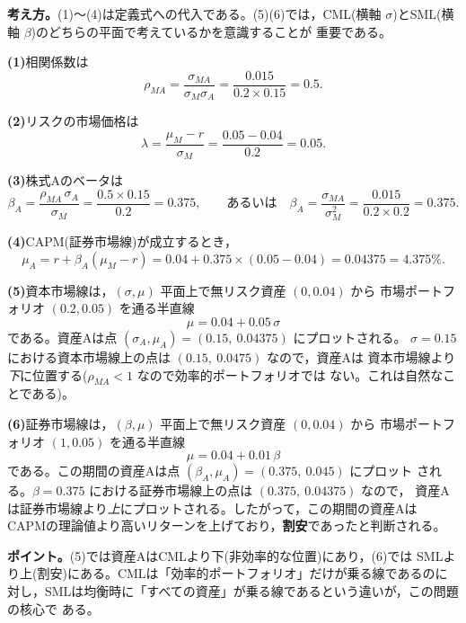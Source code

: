 \begin{answerbox}
\textbf{考え方。}(1)〜(4)は定義式への代入である。(5)(6)では，CML(横軸
$\sigma$)とSML(横軸 $\beta$)のどちらの平面で考えているかを意識することが
重要である。

\medskip
\textbf{(1)}相関係数は
\[
\rho_{MA} = \frac{\sigma_{MA}}{\sigma_M\sigma_A}
= \frac{0.015}{0.2\times 0.15} = 0.5.
\]

\textbf{(2)}リスクの市場価格は
\[
\lambda = \frac{\mu_M - r}{\sigma_M} = \frac{0.05 - 0.04}{0.2} = 0.05.
\]

\textbf{(3)}株式Aのベータは
\[
\beta_A = \frac{\rho_{MA}\,\sigma_A}{\sigma_M} = \frac{0.5\times 0.15}{0.2}
= 0.375,
\qquad\text{あるいは}\quad
\beta_A = \frac{\sigma_{MA}}{\sigma_M^2} = \frac{0.015}{0.2\times 0.2} = 0.375.
\]

\textbf{(4)}CAPM(証券市場線)が成立するとき，
\[
\mu_A = r + \beta_A(\mu_M - r) = 0.04 + 0.375\times(0.05-0.04)
= 0.04375 = 4.375\%.
\]

\textbf{(5)}資本市場線は，$(\sigma,\mu)$ 平面上で無リスク資産 $(0, 0.04)$ から
市場ポートフォリオ $(0.2, 0.05)$ を通る半直線
\[
\mu = 0.04 + 0.05\,\sigma
\]
である。資産Aは点 $(\sigma_A,\mu_A) = (0.15,\ 0.04375)$ にプロットされる。
$\sigma = 0.15$ における資本市場線上の点は $(0.15,\ 0.0475)$ なので，資産Aは
資本市場線より\emph{下}に位置する($\rho_{MA}<1$ なので効率的ポートフォリオでは
ない。これは自然なことである)。

\textbf{(6)}証券市場線は，$(\beta,\mu)$ 平面上で無リスク資産 $(0, 0.04)$ から
市場ポートフォリオ $(1, 0.05)$ を通る半直線
\[
\mu = 0.04 + 0.01\,\beta
\]
である。この期間の資産Aは点 $(\beta_A,\mu_A) = (0.375,\ 0.045)$ にプロット
される。$\beta = 0.375$ における証券市場線上の点は $(0.375,\ 0.04375)$ なので，
資産Aは証券市場線より\emph{上}にプロットされる。したがって，この期間の資産Aは
CAPMの理論値より高いリターンを上げており，\textbf{割安}であったと判断される。

\medskip
\textbf{ポイント。}(5)では資産AはCMLより下(非効率的な位置)にあり，(6)では
SMLより上(割安)にある。CMLは「効率的ポートフォリオ」だけが乗る線であるのに
対し，SMLは均衡時に「すべての資産」が乗る線であるという違いが，この問題の核心で
ある。
\end{answerbox}
